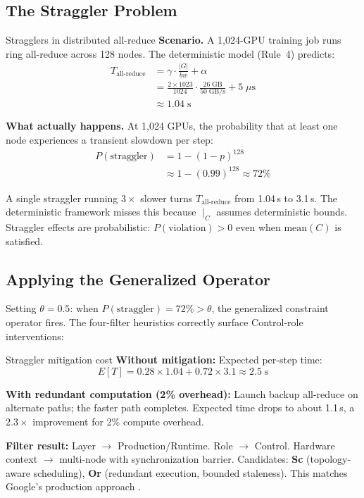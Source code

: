 \documentclass[10pt,twocolumn]{article}
\begin{document}
\subsection{The Straggler Problem}

\begin{errorcase}{Stragglers in distributed all-reduce}
\textbf{Scenario.} A 1,024-GPU training job runs ring all-reduce across 128 nodes. The deterministic model (Rule~4) predicts:
\begin{align*}
T_{\text{all-reduce}} &= \gamma \cdot \frac{|G|}{bw} + \alpha \\
&= \tfrac{2 \times 1023}{1024} \cdot \tfrac{26\;\text{GB}}{50\;\text{GB/s}} + 5\;\mu\text{s} \\
&\approx 1.04\;\text{s}
\end{align*}

\textbf{What actually happens.} At 1,024 GPUs, the probability that at least one node experiences a transient slowdown per step:
\begin{align*}
P(\text{straggler}) &= 1 - (1 - p)^{128} \\
&\approx 1 - (0.99)^{128} \approx 72\%
\end{align*}

A single straggler running $3\times$ slower turns $T_{\text{all-reduce}}$ from 1.04\,s to 3.1\,s. The deterministic framework misses this because $\mid_C$ assumes deterministic bounds. Straggler effects are probabilistic: $P(\text{violation}) > 0$ even when $\text{mean}(C)$ is satisfied.
\end{errorcase}

\subsection{Applying the Generalized Operator}

Setting $\theta = 0.5$: when $P(\text{straggler}) = 72\% > \theta$, the generalized constraint operator fires. The four-filter heuristics correctly surface Control-role interventions:

\begin{napkinmath}{Straggler mitigation cost}
\textbf{Without mitigation:} Expected per-step time:
\[
E[T] = 0.28 \times 1.04 + 0.72 \times 3.1 \approx 2.5\;\text{s}
\]

\textbf{With redundant computation (2\% overhead):} Launch backup all-reduce on alternate paths; the faster path completes. Expected time drops to about 1.1\,s, a $2.3\times$ improvement for 2\% compute overhead.

\textbf{Filter result:} Layer $\to$ Production/Runtime. Role $\to$ Control. Hardware context $\to$ multi-node with synchronization barrier. Candidates: \textbf{Sc} (topology-aware scheduling), \textbf{Or} (redundant execution, bounded staleness). This matches Google's production approach \citep{dean2013}.
\end{napkinmath}
\end{document}

